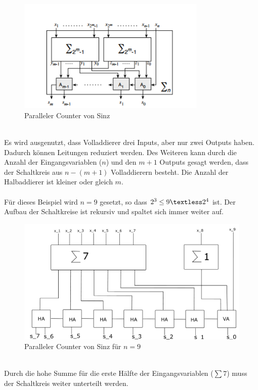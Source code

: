 \documentclass[a4,abstract=on]{scrartcl}
\begin{document}
\begin{figure}[H]
\centering
\includegraphics[width=9cm]{sinz_para.png}
\caption{Paralleler Counter von Sinz \cite[aus][Seite 9] {sinz}}
\label{fig:sinz_counter_para}
\end{figure}
\ \\
Es wird ausgenutzt, dass Volladdierer drei Inputs, aber nur zwei Outputs haben. Dadurch können Leitungen reduziert werden. Des Weiteren kann durch die Anzahl der Eingangsvariablen ($n$) und den $m+1$ Outputs gesagt werden, dass der Schaltkreis aus $n-(m+1)$ Volladdierern besteht. Die Anzahl der Halbaddierer ist kleiner oder gleich $m$.\\
\ \\
Für dieses Beispiel wird $n=9$ gesetzt, so dass $2^3 \leq 9 \textless 2^4$ ist. Der Aufbau der Schaltkreise ist rekursiv und spaltet sich immer weiter auf. 

\begin{figure}[H]
\centering
\includegraphics[width=\textwidth]{bsp_Sinz_grob.pdf}
\caption{Paralleler Counter von Sinz für $n=9$}
\label{fig:sinz_counter_para_bsp}
\end{figure}
\ \\
Durch die hohe Summe für die erste Hälfte der Eingangsvariablen ($\sum 7$) muss der Schaltkreis weiter unterteilt werden.
\end{document}
